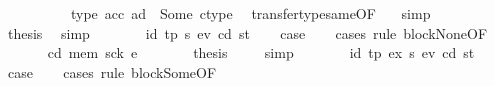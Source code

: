\begin{isabellebody}
\ \ \ \ \isamarkupfalse%
\ \isamarkupfalse%
\ {}{\isacharparenleft}{\kern0pt}{}{\isacharparenright}{\kern0pt}\ \isamarkupfalse%
\ {\isachardoublequoteopen}type\ {\isacharparenleft}{\kern0pt}acc\ ad{\isacharparenright}{\kern0pt}\ {\isacharequal}{\kern0pt}\ Some\ ctype{\isachardoublequoteclose}\ \isamarkupfalse%
\ transfer{\isacharunderscore}{\kern0pt}type{\isacharunderscore}{\kern0pt}same{\isacharbrackleft}{\kern0pt}OF\ {}{\isacharparenleft}{\kern0pt}{}{\isacharparenright}{\kern0pt}{\isacharbrackright}{\kern0pt}\ \isamarkupfalse%
\ simp\isanewline
\ \ \ \ \isamarkupfalse%
\ \isamarkupfalse%
\ {\isacharquery}{\kern0pt}thesis\ \isamarkupfalse%
\ simp\isanewline
\ \ \isamarkupfalse%
\isanewline
{}\isamarkupfalse%
\isanewline
\ \ \isamarkupfalse%
\ {\isacharparenleft}{\kern0pt}{}\ id{}\ tp\ s\ e\isactrlsub v\ cd\ st{\isacharparenright}{\kern0pt}\isanewline
\ \ \isamarkupfalse%
\ {\isacharquery}{\kern0pt}case\isanewline
\ \ \isamarkupfalse%
\ {\isacharparenleft}{\kern0pt}cases\ rule{\isacharcolon}{\kern0pt}\ blockNone{\isacharbrackleft}{\kern0pt}OF\ {}{\isacharparenleft}{\kern0pt}{}{\isacharparenright}{\kern0pt}{\isacharbrackright}{\kern0pt}{\isacharparenright}{\kern0pt}\isanewline
\ \ \ \ \isamarkupfalse%
\ {\isacharparenleft}{\kern0pt}{}\ cd{\isacharprime}{\kern0pt}\ mem{\isacharprime}{\kern0pt}\ sck{\isacharprime}{\kern0pt}\ e{\isacharprime}{\kern0pt}{\isacharparenright}{\kern0pt}\isanewline
\ \ \ \ \isamarkupfalse%
\ \isamarkupfalse%
\ {\isacharquery}{\kern0pt}thesis\ \isamarkupfalse%
\ {}\ \isamarkupfalse%
\ simp\isanewline
\ \ \isamarkupfalse%
\isanewline
{}\isamarkupfalse%
\isanewline
\ \ \isamarkupfalse%
\ {\isacharparenleft}{\kern0pt}{}{}\ id{}\ tp\ ex{\isacharprime}{\kern0pt}\ s\ e\isactrlsub v\ cd\ st{\isacharparenright}{\kern0pt}\isanewline
\ \ \isamarkupfalse%
\ {\isacharquery}{\kern0pt}case\isanewline
\ \ \isamarkupfalse%
\ {\isacharparenleft}{\kern0pt}cases\ rule{\isacharcolon}{\kern0pt}\ blockSome{\isacharbrackleft}{\kern0pt}OF\ {}{}{\isacharparenleft}{\kern0pt}{}{\isacharparenright}{\kern0pt}{\isacharbrackright}{\kern0pt}{\isacharparenright}{\kern0pt}\isanewline

\end{isabellebody}
